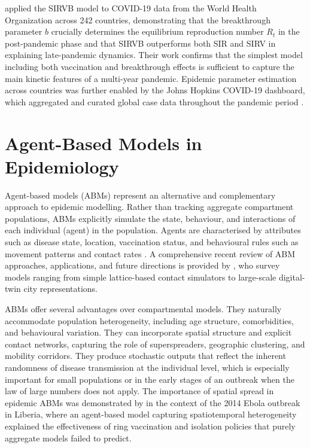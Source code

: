 \citet{ariyaratne2025} applied the SIRVB model to COVID-19 data from the World Health Organization across 242 countries, demonstrating that the breakthrough parameter $b$ crucially determines the equilibrium reproduction number $R_t$ in the post-pandemic phase and that SIRVB outperforms both SIR and SIRV in explaining late-pandemic dynamics.
Their work confirms that the simplest model including both vaccination and breakthrough effects is sufficient to capture the main kinetic features of a multi-year pandemic.
Epidemic parameter estimation across countries was further enabled by the Johns Hopkins COVID-19 dashboard, which aggregated and curated global case data throughout the pandemic period \citep{dong2022}.

\section{Agent-Based Models in Epidemiology}
\label{sec:abm}

Agent-based models (ABMs) represent an alternative and complementary approach to epidemic modelling.
Rather than tracking aggregate compartment populations, ABMs explicitly simulate the state, behaviour, and interactions of each individual (agent) in the population.
Agents are characterised by attributes such as disease state, location, vaccination status, and behavioural rules such as movement patterns and contact rates \citep{zhang2025}.
A comprehensive recent review of ABM approaches, applications, and future directions is provided by \citet{zhang2025}, who survey models ranging from simple lattice-based contact simulators to large-scale digital-twin city representations.

ABMs offer several advantages over compartmental models.
They naturally accommodate population heterogeneity, including age structure, comorbidities, and behavioural variation.
They can incorporate spatial structure and explicit contact networks, capturing the role of superspreaders, geographic clustering, and mobility corridors.
They produce stochastic outputs that reflect the inherent randomness of disease transmission at the individual level, which is especially important for small populations or in the early stages of an outbreak when the law of large numbers does not apply.
The importance of spatial spread in epidemic ABMs was demonstrated by \citet{merler2015} in the context of the 2014 Ebola outbreak in Liberia, where an agent-based model capturing spatiotemporal heterogeneity explained the effectiveness of ring vaccination and isolation policies that purely aggregate models failed to predict.

